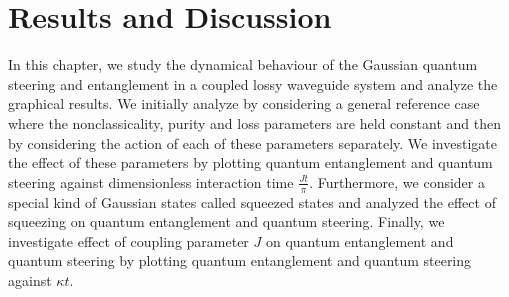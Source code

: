 
\chapter{Results and Discussion}
In this chapter, we study the dynamical behaviour of the Gaussian quantum steering and entanglement in a coupled lossy waveguide system and analyze the graphical results. We initially analyze by considering a general reference case where the nonclassicality, purity and loss parameters are held constant and then by considering the action of each of these parameters separately. We investigate the effect of these parameters by plotting quantum entanglement and quantum steering against dimensionless interaction time $ \frac{Jt}{\pi} $. Furthermore, we consider a special kind of Gaussian states called squeezed states and analyzed the effect of squeezing on quantum entanglement and quantum steering. 
Finally, we investigate effect of coupling parameter  $J$ on quantum entanglement and  quantum steering by plotting quantum entanglement and quantum steering against $\kappa t$.

